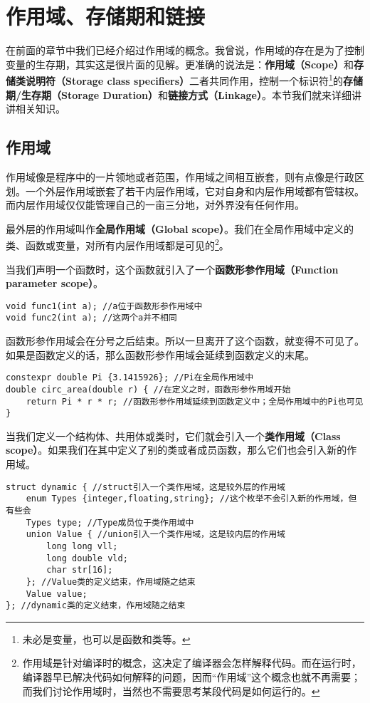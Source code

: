 \section{作用域、存储期和链接}
在前面的章节中我们已经介绍过作用域的概念。我曾说，作用域的存在是为了控制变量的生存期，其实这是很片面的见解。更准确的说法是：\textbf{作用域（Scope）}和\textbf{存储类说明符（Storage class specifiers）}二者共同作用，控制一个标识符\footnote{未必是变量，也可以是函数和类等。}的\textbf{存储期/生存期（Storage Duration）}和\textbf{链接方式（Linkage）}。本节我们就来详细讲讲相关知识。\par
\subsection*{作用域}
作用域像是程序中的一片领地或者范围，作用域之间相互嵌套，则有点像是行政区划。一个外层作用域嵌套了若干内层作用域，它对自身和内层作用域都有管辖权。而内层作用域仅仅能管理自己的一亩三分地，对外界没有任何作用。\par
最外层的作用域叫作\textbf{全局作用域（Global scope）}。我们在全局作用域中定义的类、函数或变量，对所有内层作用域都是可见的\footnote{作用域是针对编译时的概念，这决定了编译器会怎样解释代码。而在运行时，编译器早已解决代码如何解释的问题，因而``作用域''这个概念也就不再需要；而我们讨论作用域时，当然也不需要思考某段代码是如何运行的。}。\par
当我们声明一个函数时，这个函数就引入了一个\textbf{函数形参作用域（Function parameter scope）}。
\begin{lstlisting}
void func1(int a); //a位于函数形参作用域中
void func2(int a); //这两个a并不相同
\end{lstlisting}
函数形参作用域会在分号之后结束。所以一旦离开了这个函数，\lstinline@a@ 就变得不可见了。如果是函数定义的话，那么函数形参作用域会延续到函数定义的末尾。
\begin{lstlisting}
constexpr double Pi {3.1415926}; //Pi在全局作用域中
double circ_area(double r) { //在定义之时，函数形参作用域开始
    return Pi * r * r; //函数形参作用域延续到函数定义中；全局作用域中的Pi也可见
}
\end{lstlisting}\par
当我们定义一个结构体、共用体或类时，它们就会引入一个\textbf{类作用域（Class scope）}。如果我们在其中定义了别的类或者成员函数，那么它们也会引入新的作用域。\par
\begin{lstlisting}
struct dynamic { //struct引入一个类作用域，这是较外层的作用域
    enum Types {integer,floating,string}; //这个枚举不会引入新的作用域，但有些会
    Types type; //Type成员位于类作用域中
    union Value { //union引入一个类作用域，这是较内层的作用域
        long long vll;
        long double vld;
        char str[16];
    }; //Value类的定义结束，作用域随之结束
    Value value;
}; //dynamic类的定义结束，作用域随之结束
\end{lstlisting}
